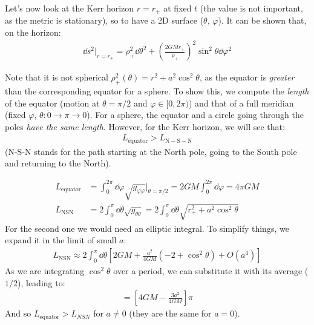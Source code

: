 \documentclass[../template.tex]{subfiles}
\begin{document}
Let's now look at the Kerr horizon $r=r_+$ at fixed $t$ (the value is not important, as the metric is stationary), so to have a 2D surface ($\theta$, $\varphi$). It can be shown that, on the horizon:
\begin{align*}
    \dd{s^2} \Big|_{r=r_+} = \rho_+^2 \dd{\theta^2} + \left(\frac{2GM r_+}{\rho_+} \right)^2 \sin^2 \theta \dd{\varphi^2}
\end{align*}

Note that it is not spherical $\rho_+^2 (\theta) = r^2 + a^2 \cos^2 \theta$, as the equator is \textit{greater} than the corresponding equator for a sphere. To show this, we compute the \textit{length} of the equator (motion at $\theta= \pi/2  $ and $\varphi \in [0, 2\pi)$) and that of a full meridian (fixed $\varphi$, $\theta\colon 0 \to \pi \to 0$). For a sphere, the equator and a circle going through the poles \textit{have the same length}. However, for the Kerr horizon, we will see that:
\begin{align*}
    L_{\mathrm{equator}} > L_{\mathrm{N-S-N} }
\end{align*}    
(N-S-N stands for the path starting at the North pole, going to the South pole and returning to the North).

\begin{align*}
    L_{\mathrm{equator}} &= \int_0^{2 \pi} \dd{\varphi} \sqrt{g_{\varphi \varphi} } \Big|_{\theta= \pi/2 } = 2GM \int_0^{2\pi} \dd{\varphi} = 4\pi GM\\
    L_{\mathrm{NSN}} &= 2 \int_0^\pi \dd{\theta} \sqrt{g_{\theta\theta}} = 2 \int_0^{\pi} \dd{\theta} \sqrt{r^2_+ + a^2 \cos^2 \theta}
\end{align*}
For the second one we would need an elliptic integral. To simplify things, we expand it in the limit of small $a$: 
\begin{align*}
    L_{\mathrm{NSN}} \approx 2 \int_0^\pi \dd{\theta} \left[2GM + \frac{a^2}{4GM}(-2 + \cos^2 \theta) + O(a^4)\right] 
\end{align*}
As we are integrating $\cos^2 \theta$ over a period, we can substitute it with its average ($1/2$), leading to:
\begin{align*}
    =  \left[4GM - \frac{3a^2}{4 GM} \right] \pi 
\end{align*}  
And so $L_{\mathrm{equator} } > L_{NSN}$ for $a \neq 0$ (they are the same for $a=0$).   
\end{document}
